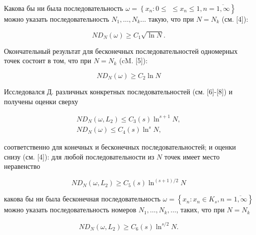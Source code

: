 \documentclass[10pt]{article}
\begin{document}
Какова бы ни была последовательность $\omega=\left\{x_{n}: 0 \leqslant\right.$ $\left.\leqslant x_{n} \leqslant 1, n=\overline{1, \infty}\right\}$ можно указать последовательность $N_{1}, \ldots, N_{k} \ldots$ такую, что при $N=N_{k}$ (см. [4]):



\[

N D_{N}(\omega) \geqslant C_{1} \sqrt{\ln N} .

\]



Окончательный результат для бесконечных последовательностей одномерных точек состоит в том, что при $N=N_{k}$ (cM. [5]):



\[

N D_{N}(\omega) \geqslant C_{2} \ln N

\]



Исследовался Д. различных конкретных последовательностей (см. [6]-[8]) и получены оценки сверху



\[

\begin{gathered}

N D_{N}\left(\omega, L_{2}\right) \leqslant C_{3}(s) \ln ^{s+1} N, \\

N D_{N}(\omega) \leqslant C_{4}(s) \ln ^{s} N,

\end{gathered}

\]



соответственно для конечных и бесконечных последовательностей; и оценки снизу (см. [4]): для любой последовательности из $N$ точек имеет место неравенство



\[

N D_{N}\left(\omega, L_{2}\right) \geqslant C_{5}(s) \ln ^{(s+1) / 2} N

\]



какова бы ни была бесконечная последовательность $\omega=\left\{x_{n}: x_{n} \in K_{s}, n=\overline{1, \infty}\right\}$ можно указать последовательность номеров $N_{1}, \ldots, N_{k}, \ldots$, таких, что при $N=N_{k}$



\[

N D_{N}\left(\omega, L_{2}\right) \geqslant C_{6}(s) \ln ^{s / 2} N .

\]
\end{document}

